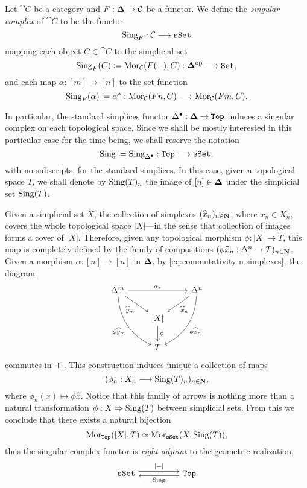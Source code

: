 \begin{definition}
\label{def:singular-complex-functor}
Let \(\cat C\) be a category and \(F: {\mathbf{\Delta}} \to \mathcal C\) be a functor. We define
the \emph{singular complex} of \(\cat C\) to be the functor
\[
\operatorname{Sing}_F: \mathcal C \longrightarrow {\texttt{sSet}}
\]
mapping each object \(C \in \cat C\) to the simplicial set
\[
\operatorname{Sing}_F(C) \coloneq \operatorname{Mor}_{\mathcal C}(F(-), C): {\mathbf{\Delta}}^{\mathrm{op}} \longrightarrow {\texttt{Set}},
\]
and each map \(\alpha: [m] \to [n]\) to the set-function
\[
\operatorname{Sing}_F(\alpha) \coloneq \alpha^{*}:
\operatorname{Mor}_{\mathcal C}(F n, C) \longrightarrow \operatorname{Mor}_{\mathcal C}(F m, C).
\]

In particular, the standard simplices functor \(\Delta^{\bullet}: {\mathbf{\Delta}} \to
{\texttt{Top}}\) induces a singular complex on each topological space. Since we shall be
mostly interested in this particular case for the time being, we shall reserve
the notation
\[
\operatorname{Sing} \coloneq \operatorname{Sing}_{\Delta^{\bullet}}: {\texttt{Top}} \longrightarrow {\texttt{sSet}},
\]
with no subscripts, for the standard simplices. In this case, given a
topological space \(T\), we shall denote by \(\operatorname{Sing}(T)_n\) the image of
\([n] \in {\mathbf{\Delta}}\) under the simplicial set \(\operatorname{Sing}(T)\).
\end{definition}

Given a simplicial set \(X\), the collection of simplexes
\((\widehat{x}_n)_{n \in \mathbf{N}}\), where \(x_n \in X_n\), covers the whole
topological space \(|X|\)---in the sense that collection of images forms a cover
of \(|X|\). Therefore, given any topological morphism \(\phi: |X| \to T\), this
map is completely defined by the family of compositions
\((\phi \widehat{x}_n: \Delta^n \to T)_{n \in \mathbf{N}}\). Given a morphism
\(\alpha: [n] \to [n]\) in \({\mathbf{\Delta}}\), by \cref{eq:commutativity-n-simplexes},
the diagram
\[
\begin{tikzcd}
\Delta^m \ar[rr, "\alpha_{*}"]
\ar[rd, "\widehat y_m"']
\ar[drd, bend right, "\phi \widehat y_m"']
& &\Delta^n \ar[ld, "\widehat x_n"]
\ar[dld, bend left, "\phi \widehat x_n"] \\
&{|X|} \ar[d, "\phi"] & \\
&T &
\end{tikzcd}
\]
commutes in \(\Top\). This construction induces unique a collection of maps
\[
(\phi_n: X_n \longrightarrow \operatorname{Sing}(T)_n)_{n \in \mathbf{N}},
\]
where \(\phi_n(x) \mapsto \phi \widehat x\). Notice that this family of arrows
is nothing more than a natural transformation \(\phi: X \Rightarrow \operatorname{Sing}(T)\) between
simplicial sets. From this we conclude that there exists a natural bijection
\[
\operatorname{Mor}_{{\texttt{Top}}}(|X|, T) \simeq \operatorname{Mor}_{{\texttt{sSet}}}(X, \operatorname{Sing}(T)),
\]
thus the singular complex functor is \emph{right adjoint} to the geometric
realization,
\[
\begin{tikzcd}
\sSet \ar[rr, shift left, "{|-|}"] &&\Top \ar[ll, shift left, "\Sing"]
\end{tikzcd}
\]

